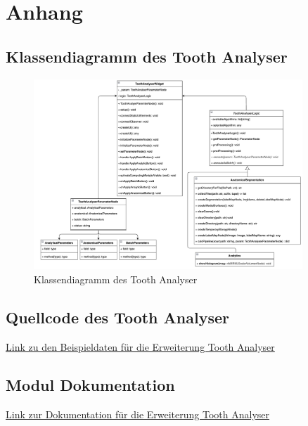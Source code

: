 \chapter{Anhang}
\label{chap:anhang}

\section{Klassendiagramm des Tooth Analyser}
\begin{figure}[h]
	\centering
	\includegraphics[width=0.9\textwidth, angle=90]{img/toothAnalyserClasses.png}
	\caption{Klassendiagramm des Tooth Analyser}
	\label{fig:klassendiagramm_gesamt}
\end{figure}

\section{Quellcode des Tooth Analyser}
\href{https://github.com/lukaskonietzka/SlicerToothAnalyser/blob/main/ToothAnalyser/ToothAnalyser.py}{Link
zu den Beispieldaten für die Erweiterung Tooth Analyser}

\section{Modul Dokumentation}
\href{https://github.com/lukaskonietzka/SlicerToothAnalyser/tree/main}{Link zur
Dokumentation für die Erweiterung Tooth Analyser}

